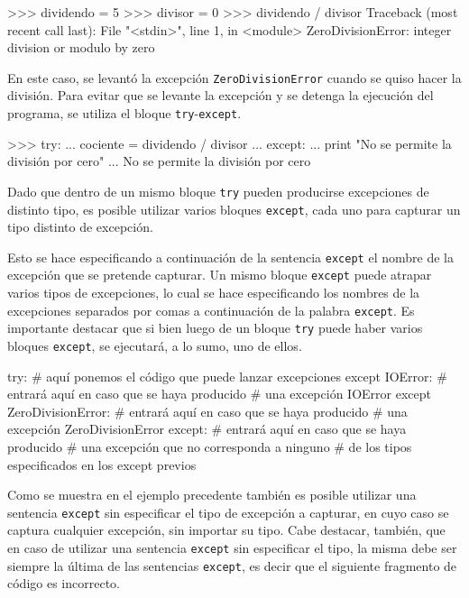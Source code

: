 \begin{codigo-python-sn}
>>> dividendo = 5
>>> divisor = 0
>>> dividendo / divisor
Traceback (most recent call last):
  File "<stdin>", line 1, in <module>
ZeroDivisionError: integer division or modulo by zero
\end{codigo-python-sn}

En este caso, se levantó la excepción \lstinline!ZeroDivisionError! cuando se
quiso hacer la división.  Para evitar que se levante la excepción y se detenga
la ejecución del programa, se utiliza el bloque
\lstinline!try!-\lstinline!except!.

\begin{codigo-python-sn}
>>> try:
...     cociente = dividendo / divisor
... except:
...     print "No se permite la división por cero"
...
No se permite la división por cero
\end{codigo-python-sn}

Dado que dentro de un mismo bloque \lstinline!try! pueden producirse
excepciones de distinto tipo, es posible utilizar varios bloques
\lstinline!except!, cada uno para capturar un tipo distinto de excepción.

Esto se hace especificando a continuación de la sentencia
\lstinline!except! el nombre de la excepción que se pretende capturar. Un
mismo bloque \lstinline!except! puede atrapar varios tipos de excepciones,
lo cual se hace especificando los nombres de la excepciones separados por
comas a continuación de la palabra \lstinline!except!. Es importante
destacar que si bien luego de un bloque \lstinline!try! puede haber varios
bloques \lstinline!except!, se ejecutará, a lo sumo, uno de ellos.

\begin{codigo-python-sn}
try:
	# aquí ponemos el código que puede lanzar excepciones
except IOError:
	# entrará aquí en caso que se haya producido
	# una excepción IOError
except ZeroDivisionError:
	# entrará aquí en caso que se haya producido
	# una excepción ZeroDivisionError
except:
	# entrará aquí en caso que se haya producido
	# una excepción que no corresponda a ninguno
	# de los tipos especificados en los except previos
\end{codigo-python-sn}

Como se muestra en el ejemplo precedente también es posible utilizar una
sentencia \lstinline!except! sin especificar el tipo de excepción a
capturar, en cuyo caso se captura cualquier excepción, sin importar su
tipo. Cabe destacar, también, que en caso de utilizar una sentencia
\lstinline!except! sin especificar el tipo, la misma debe ser siempre la
última de las sentencias \lstinline!except!, es decir que el siguiente
fragmento de código es incorrecto.

